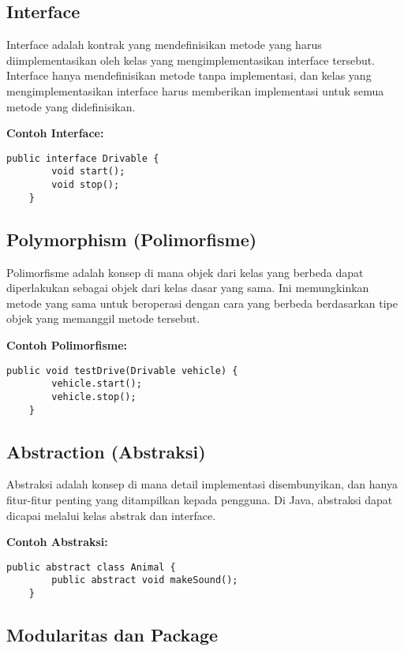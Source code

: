 \subsection{Interface}

Interface adalah kontrak yang mendefinisikan metode yang harus diimplementasikan oleh kelas yang mengimplementasikan interface tersebut. Interface hanya mendefinisikan metode tanpa implementasi, dan kelas yang mengimplementasikan interface harus memberikan implementasi untuk semua metode yang didefinisikan.

\textbf{Contoh Interface:}

\begin{lstlisting}[style=JavaStyle]
	public interface Drivable {
		void start();
		void stop();
	}
\end{lstlisting}

\subsection{Polymorphism (Polimorfisme)}

Polimorfisme adalah konsep di mana objek dari kelas yang berbeda dapat diperlakukan sebagai objek dari kelas dasar yang sama. Ini memungkinkan metode yang sama untuk beroperasi dengan cara yang berbeda berdasarkan tipe objek yang memanggil metode tersebut.

\textbf{Contoh Polimorfisme:}

\begin{lstlisting}[style=JavaStyle]
	public void testDrive(Drivable vehicle) {
		vehicle.start();
		vehicle.stop();
	}
\end{lstlisting}

\subsection{Abstraction (Abstraksi)}

Abstraksi adalah konsep di mana detail implementasi disembunyikan, dan hanya fitur-fitur penting yang ditampilkan kepada pengguna. Di Java, abstraksi dapat dicapai melalui kelas abstrak dan interface.

\textbf{Contoh Abstraksi:}

\begin{lstlisting}[style=JavaStyle]
	public abstract class Animal {
		public abstract void makeSound();
	}
\end{lstlisting}

\subsection{Modularitas dan Package}

